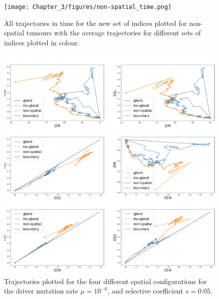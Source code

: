 \begin{figure}[h]
\centering
\texttt{[image: Chapter\_3/figures/non-spatial\_time.png]}
\caption{All trajectories in time for the new set of indices plotted for
    non-spatial tumours with the average trajectories for different
    sets of indices plotted in colour.}
\label{fig:non-spatial_time}
\end{figure}

\begin{figure}[h]
\centering
\includegraphics[width=\textwidth]{Chapter_3/figures/1e06005new.pdf}
\caption{Trajectories plotted for the four different spatial configurations for
    the driver mutation rate $\mu=10^{-6}$, and selective coefficient
    $s=0.05$.}
\label{fig:1e06005new}
\end{figure}


